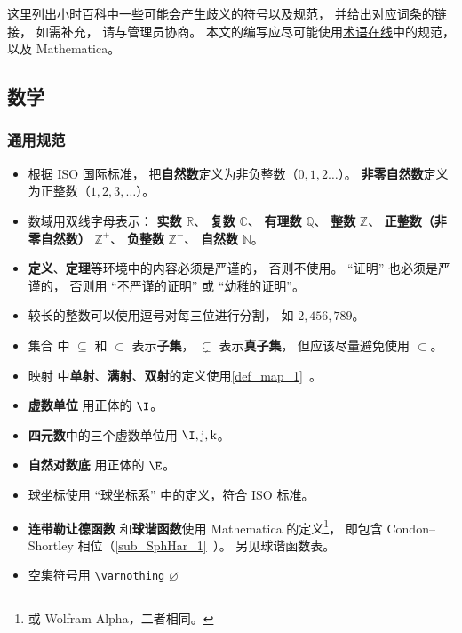 
这里列出小时百科中一些可能会产生歧义的符号以及规范， 并给出对应词条的链接， 如需补充， 请与管理员协商。 本文的编写应尽可能使用\href{https://www.termonline.cn/about}{术语在线}中的规范，以及 Mathematica。

\subsection{数学}
\subsubsection{通用规范}
\begin{itemize}
\item 根据 ISO \href{https://en.wikipedia.org/wiki/ISO/IEC_80000}{国际标准}， 把\textbf{自然数}定义为非负整数（$0,1,2\dots$）。 \textbf{非零自然数}定义为正整数（$1,2,3,\dots$）。
\item 数域用双线字母表示： \textbf{实数} $\mathbb R$、 \textbf{复数} $\mathbb C$、 \textbf{有理数} $\mathbb Q$、 \textbf{整数} $\mathbb Z$、 \textbf{正整数（非零自然数）} $\mathbb Z^+$、 \textbf{负整数} $\mathbb Z^-$、 \textbf{自然数} $\mathbb N$。%
\item \textbf{定义}、\textbf{定理}等环境中的内容必须是严谨的， 否则不使用。 “证明” 也必须是严谨的， 否则用 “不严谨的证明” 或 “幼稚的证明”。
\item 较长的整数可以使用逗号对每三位进行分割， 如 $2,456,789$。
\item 集合 中 $\subseteq$ 和 $\subset$ 表示\textbf{子集}， $\subsetneq$ 表示\textbf{真子集}， 但应该尽量避免使用 $\subset$。
\item 映射 中\textbf{单射}、\textbf{满射}、\textbf{双射}的定义使用\autoref{def_map_1}~。
\item \textbf{虚数单位} 用正体的 $\I$。
\item \textbf{四元数}中的三个虚数单位用 $\I, \mathrm{j}, \mathrm{k}$。
\item \textbf{自然对数底} 用正体的 $\E$。
\item 球坐标使用 “球坐标系” 中的定义，符合 \href{https://www.iso.org/standard/64973.html}{ISO 标准}。
\item \textbf{连带勒让德函数} 和\textbf{球谐函数}使用 Mathematica 的定义\footnote{或 Wolfram Alpha，二者相同。}， 即包含 Condon–Shortley 相位（\autoref{sub_SphHar_1}~）。 另见球谐函数表。
\item 空集符号用 \verb|\varnothing| $\varnothing$
\end{itemize}

